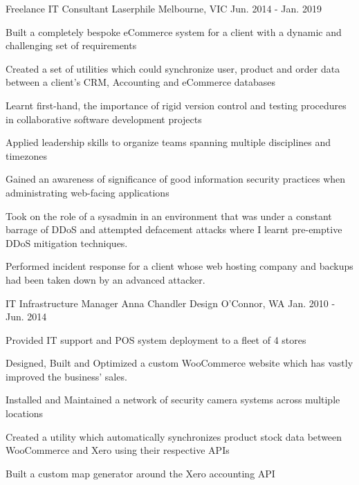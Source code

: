 \begin{cventries}
  \cventry
    {Freelance IT Consultant} %
    {Laserphile} %
    {Melbourne, VIC} %
    {Jun. 2014 - Jan. 2019} %
    {
      \begin{cvitems} %
        \item {Built a completely bespoke eCommerce system for a client with a dynamic and challenging set of requirements}
        \item {Created a set of utilities which could synchronize user, product and order data between a client's CRM, Accounting and eCommerce databases}
        \item {Learnt first-hand, the importance of rigid version control and testing procedures in collaborative software development projects}
        \item {Applied leadership skills to organize teams spanning multiple disciplines and timezones}
        \item {Gained an awareness of significance of good information security practices when administrating web-facing applications}
        \item {Took on the role of a sysadmin in an environment that was under a constant barrage of DDoS and attempted defacement attacks where I learnt pre-emptive DDoS mitigation techniques.}
        \item {Performed incident response for a client whose web hosting company and backups had been taken down by an advanced attacker.}
      \end{cvitems}
    }

  \cventry
    {IT Infrastructure Manager} %
    {Anna Chandler Design} %
    {O'Connor, WA} %
    {Jan. 2010 - Jun. 2014} %
    {
    \begin{cvitems} %
        \item {Provided IT support and POS system deployment to a fleet of 4 stores}
        \item {Designed, Built and Optimized a custom WooCommerce website which has vastly improved the business’ sales.}
        \item {Installed and Maintained a network of security camera systems across multiple locations}
        \item {Created a utility which automatically synchronizes product stock data between WooCommerce and Xero using their respective APIs}
        \item {Built a custom map generator around the Xero accounting API}
    \end{cvitems}
    }

\end{cventries}

